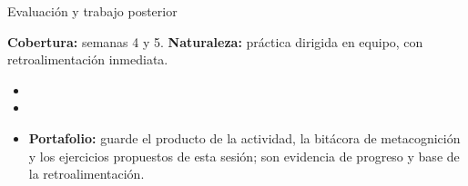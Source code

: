 \documentclass[10pt,aspectratio=169]{beamer}
\begin{document}
\begin{frame}{Evaluación y trabajo posterior}
  \small
  \begin{evalbox}
    \textbf{Cobertura:} semanas 4 y 5. \textbf{Naturaleza:} práctica dirigida en equipo, con retroalimentación inmediata.
  \end{evalbox}
  \begin{itemize}
    \item \criterios
    \item \declaracionia
    \item \textbf{Portafolio:} guarde el producto de la actividad, la bitácora de metacognición y los ejercicios propuestos de esta sesión; son evidencia de progreso y base de la retroalimentación.
  \end{itemize}
\end{frame}
\end{document}
